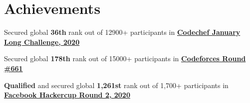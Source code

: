 \documentclass[]{deedy-resume-openfont}
\begin{document}
\begin{minipage}[t]{0.69\textwidth}
\section{Achievements}
\vspace{\topsep}
\begin{tightemize}
\item Secured global \textbf{36th} rank out of 12900+ participants in \href{https://www.codechef.com/rankings/JAN20B?filterBy=Institution\%3DNational\%20Institute\%20of\%20Technology\%20Tiruchirappalli&order=asc&sortBy=rank}{\textbf{Codechef January Long Challenge, 2020}} \item Secured global \textbf{178th} rank out of 15000+ participants in \href{https://codeforces.com/bestRatingChanges/3520822}{\textbf{Codeforces Round \#661}} \item \textbf{Qualified} and secured global \textbf{1,261st} rank out of 1,700+ participants in \href{https://www.facebook.com/codingcompetitions/hacker-cup/2020/round-2}{\textbf{Facebook Hackercup Round 2, 2020}}
\end{tightemize}


\end{minipage}
\end{document}
